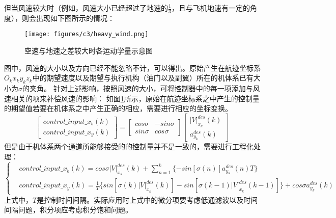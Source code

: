 但当风速较大时（例如，风速大小已经超过了地速的$\frac{1}{3}$，且与飞机地速有一定的角度），则会出现如下图所示的情况：
\begin{figure}[H]
    \centering
    \texttt{[image: figures/c3/heavy\_wind.png]}
    \caption{空速与地速之差较大时各运动学量示意图}\label{fig:heavy_wind}
\end{figure}
图中，风速的大小以及方向已经不能忽略不计，可以得出。原始产生在航迹坐标系$O_kx_ky_kz_k$中的期望速度以及期望与执行机构（油门以及副翼）所在的机体系已有大小为$\sigma$的夹角。
针对上述影响，按照风速的大小，可将控制器中的每一项添加与风速相关的项来补偿风速的影响：
如图\ref{fig:heavy_wind}所示，原始在航迹坐标系之中产生的控制量的期望值若要在机体系之中产生正确的相应，需要进行相应的坐标变换。
\begin{equation}
    \left[
    \begin{matrix}
        control\_input\_x_b(k)\\
        control\_input\_x_y(k)
    \end{matrix}
    \right]
    =
    \left[
    \begin{matrix}
        cos\sigma& -sin\sigma\\
        sin\sigma& cos\sigma
    \end{matrix}
    \right]
    \left[
        \begin{matrix}
            |V|_{x_k}^{des}(k)\\
            a_{y_k}^{des}(k)
        \end{matrix}
        \right]
\end{equation}
但是由于机体系两个通道所能够接受的的控制量并不是一致的，需要进行工程化处理：
\begin{equation}
    \left\{
        \begin{aligned}
            &control\_input\_x_b(k)=cos\sigma|V|_{x_k}^{des}(k)+\sum_{n=1}^k\{-sin[\sigma(n)]a_{y_k}^{des}(n)T\}\\
            &control\_input\_x_y(k)=\frac{1}{T}\{sin[\sigma(k)|V|_{x_k}^{des}(k)]-sin[\sigma(k-1)|V|_{x_k}^{des}(k-1)]\}+cos\sigma a_{y_k}^{des}(k)
        \end{aligned}
    \right .
\end{equation}
上式中，$T$是控制时间间隔。实际应用时上式中的微分项要考虑低通滤波以及时间间隔问题，积分项应考虑积分饱和问题。
